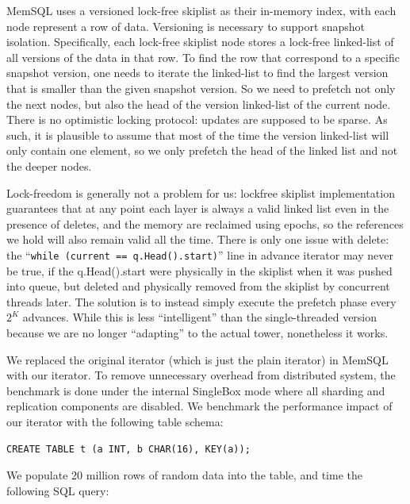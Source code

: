 \documentclass[11pt, usletter]{article}
\begin{document}
MemSQL uses a versioned lock-free skiplist as their in-memory index, with each node represent a row of data. 
Versioning is necessary to support snapshot isolation.
Specifically, each lock-free skiplist node stores a lock-free linked-list of all versions of the data in that row.
To find the row that correspond to a specific snapshot version,
one needs to iterate the linked-list to find the largest version that is smaller than the given snapshot version. 
So we need to prefetch not only the next nodes, but also the head of the version linked-list of the current node.
There is no optimistic locking protocol: updates are supposed to be sparse. 
As such, it is plausible to assume that most of the time the version linked-list will only contain one element, 
so we only prefetch the head of the linked list and not the deeper nodes. 

Lock-freedom is generally not a problem for us: 
lockfree skiplist implementation guarantees that 
at any point each layer is always a valid linked list even in the presence of deletes, 
and the memory are reclaimed using epochs, 
so the references we hold will also remain valid all the time. 
There is only one issue with delete: the ``\verb|while (current == q.Head().start)|'' line in advance iterator 
may never be true, if the q.Head().start were physically in the skiplist when it was pushed into queue, 
but deleted and physically removed from the skiplist by concurrent threads later. 
The solution is to instead simply execute the prefetch phase every $2^K$ advances. 
While this is less ``intelligent'' than the single-threaded version 
because we are no longer ``adapting'' to the actual tower, nonetheless it works.

We replaced the original iterator (which is just the plain iterator) in MemSQL with our iterator. 
To remove unnecessary overhead from distributed system, 
the benchmark is done under the internal SingleBox mode where all sharding and replication components are disabled.
We benchmark the performance impact of our iterator with the following table schema:

\singlespacing\begin{codebox}
\begin{verbatim}
CREATE TABLE t (a INT, b CHAR(16), KEY(a));
\end{verbatim}
\end{codebox}\doublespacing

We populate 20 million rows of random data into the table, and time the following SQL query:
\end{document}
